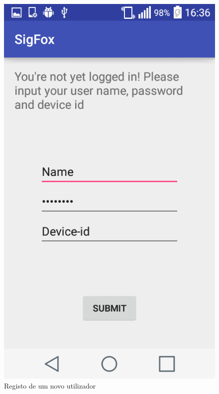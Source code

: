 \documentclass[a4paper]{article}
\begin{document}
\begin{figure}[H]
  \includegraphics[width=\linewidth]{newUser.png}
  \caption{Registo de um novo utilizador}\label{fig:newUser}
\endminipage\hfill
{}%

\end{figure}
\end{document}
